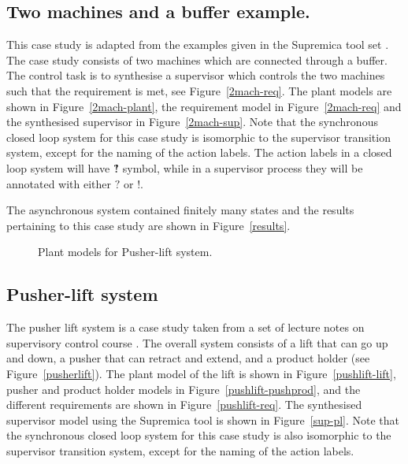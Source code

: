 \documentclass[a4paper,english,final]{article}
\theoremstyle{plain}
\theoremstyle{definition}
\newcommand{\com}{\ensuremath{?\mkern-6mu!}}
\begin{document}
\subsection{Two machines and a buffer example.}\label{subsec-2machbuf}
This case study is adapted from the examples given in the Supremica tool set \cite{supremica}. The case study consists of two machines which are connected through a buffer. The control task is to synthesise a supervisor which controls the two machines such that the requirement is met, see Figure~\ref{2mach-req}. The plant models are shown in Figure~\ref{2mach-plant}, the requirement model in Figure~\ref{2mach-req} and the synthesised supervisor in Figure~\ref{2mach-sup}. Note that the synchronous closed loop system for this case study is isomorphic to the supervisor transition system, except for the naming of the action labels. The action labels in a closed loop system will have $\com$ symbol, while in a supervisor process they will be annotated with either $?$ or $!$.

The asynchronous system contained finitely many states and the results pertaining to this case study are shown in Figure~\ref{results}.

\begin{figure}\centering
{}
\caption{Plant models for Pusher-lift system.}\label{plantmodels-pl}
\end{figure}

\subsection{Pusher-lift system }\label{subsec-pl}
The pusher lift system is a case study taken from a set of lecture notes on supervisory control course \cite{4k460}. The overall system consists of a lift that can go up and down, a pusher that can retract and extend, and a product holder (see Figure~\ref{pusherlift}). The plant model of the lift is shown in Figure~\ref{pushlift-lift}, pusher and product holder models in Figure~\ref{pushlift-pushprod}, and the different requirements are shown in Figure~\ref{pushlift-req}. The synthesised supervisor model using the Supremica tool is shown in Figure~\ref{sup-pl}. Note that the synchronous closed loop system for this case study is also isomorphic to the supervisor transition system, except for the naming of the action labels.
\end{document}
